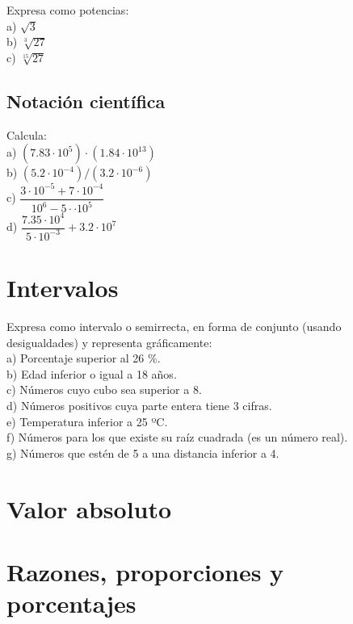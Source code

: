 \begin{ejer}
Expresa como potencias: \\
a) $\sqrt{3}$ \\
b) $\sqrt[3]{27}$ \\
c) $\sqrt[15]{27}$
\end{ejer}

\subsection{Notación científica}

\begin{ejer}
Calcula: \\
a) $(7.83\cdot 10^{5})\cdot (1.84 \cdot 10^{13})$ \\
b) $(5.2 \cdot 10^{-4}) / (3.2 \cdot 10^{-6})$ \\
c) $\dfrac{3 \cdot 10^{-5} +7 \cdot 10^{-4}}{10^{6}-5\cdot \cdot 10^{5}}$ \\
d) $\dfrac{7.35\cdot 10^{4}}{5 \cdot 10^{-3}} + 3.2 \cdot 10^{7}$
\end{ejer}

\section{Intervalos}

\begin{ejer}
Expresa como intervalo o semirrecta, en forma de conjunto (usando desigualdades) y representa gráficamente: \\
a) Porcentaje superior al 26 \%. \\
b) Edad inferior o igual a 18 años. \\
c) Números cuyo cubo sea superior a 8. \\
d) Números positivos cuya parte entera tiene 3 cifras. \\
e) Temperatura inferior a 25 ºC. \\
f) Números para los que existe su raíz cuadrada (es un número real). \\
g) Números que estén de 5 a una distancia inferior a 4.
\end{ejer}

\section{Valor absoluto}



\section{Razones, proporciones y porcentajes}

